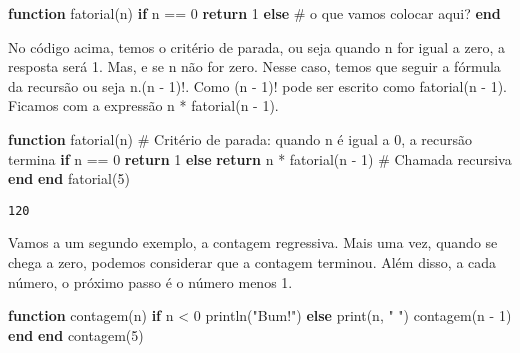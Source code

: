 \documentclass[
  letterpaper,
  DIV=11,
  numbers=noendperiod]{scrreprt}
\newenvironment{Shaded}{\begin{snugshade}}{\end{snugshade}}
\newcommand{\CommentTok}[1]{\textcolor[rgb]{0.37,0.37,0.37}{#1}}
\newcommand{\ControlFlowTok}[1]{\textcolor[rgb]{0.00,0.23,0.31}{\textbf{#1}}}
\newcommand{\FloatTok}[1]{\textcolor[rgb]{0.68,0.00,0.00}{#1}}
\newcommand{\FunctionTok}[1]{\textcolor[rgb]{0.28,0.35,0.67}{#1}}
\newcommand{\KeywordTok}[1]{\textcolor[rgb]{0.00,0.23,0.31}{\textbf{#1}}}
\newcommand{\NormalTok}[1]{\textcolor[rgb]{0.00,0.23,0.31}{#1}}
\newcommand{\OperatorTok}[1]{\textcolor[rgb]{0.37,0.37,0.37}{#1}}
\newcommand{\StringTok}[1]{\textcolor[rgb]{0.13,0.47,0.30}{#1}}
\begin{document}
\begin{Shaded}
\begin{Highlighting}[]
\KeywordTok{function} \FunctionTok{fatorial}\NormalTok{(n)}
 \ControlFlowTok{if}\NormalTok{ n }\OperatorTok{==} \FloatTok{0}
   \ControlFlowTok{return} \FloatTok{1}
 \ControlFlowTok{else}
   \CommentTok{\# o que vamos colocar aqui?}
\ControlFlowTok{end}
\end{Highlighting}
\end{Shaded}

No código acima, temos o critério de parada, ou seja quando n for igual
a zero, a resposta será 1. Mas, e se n não for zero. Nesse caso, temos
que seguir a fórmula da recursão ou seja n.(n - 1)!. Como (n - 1)! pode
ser escrito como fatorial(n - 1). Ficamos com a expressão n * fatorial(n
- 1).

\begin{Shaded}
\begin{Highlighting}[]
\KeywordTok{function} \FunctionTok{fatorial}\NormalTok{(n)}
 \CommentTok{\# Critério de parada: quando n é igual a 0, a recursão termina}
 \ControlFlowTok{if}\NormalTok{ n }\OperatorTok{==} \FloatTok{0}
   \ControlFlowTok{return} \FloatTok{1}
 \ControlFlowTok{else}
   \ControlFlowTok{return}\NormalTok{ n }\OperatorTok{*} \FunctionTok{fatorial}\NormalTok{(n }\OperatorTok{{-}} \FloatTok{1}\NormalTok{) }\CommentTok{\# Chamada recursiva}
 \ControlFlowTok{end}
\KeywordTok{end}
\FunctionTok{fatorial}\NormalTok{(}\FloatTok{5}\NormalTok{)}
\end{Highlighting}
\end{Shaded}

\begin{verbatim}
120
\end{verbatim}

Vamos a um segundo exemplo, a contagem regressiva. Mais uma vez, quando
se chega a zero, podemos considerar que a contagem terminou. Além disso,
a cada número, o próximo passo é o número menos 1.

\begin{Shaded}
\begin{Highlighting}[]
\KeywordTok{function} \FunctionTok{contagem}\NormalTok{(n)}
   \ControlFlowTok{if}\NormalTok{ n }\OperatorTok{\textless{}} \FloatTok{0}
       \FunctionTok{println}\NormalTok{(}\StringTok{"Bum!"}\NormalTok{)}
   \ControlFlowTok{else}
       \FunctionTok{print}\NormalTok{(n, }\StringTok{" "}\NormalTok{)}
       \FunctionTok{contagem}\NormalTok{(n }\OperatorTok{{-}} \FloatTok{1}\NormalTok{)}
   \ControlFlowTok{end}
\KeywordTok{end}
\FunctionTok{contagem}\NormalTok{(}\FloatTok{5}\NormalTok{)}
\end{Highlighting}
\end{Shaded}
\end{document}
